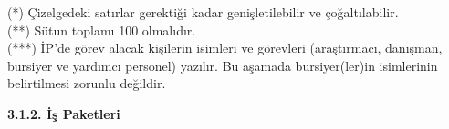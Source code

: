 \begin{landscape}
\begin{center}
\end{center}





{\footnotesize
\noindent(*) Çizelgedeki satırlar gerektiği kadar genişletilebilir ve çoğaltılabilir.\\
\noindent(**) Sütun toplamı 100 olmalıdır.\\
\noindent(***) İP'de görev alacak kişilerin isimleri ve görevleri (araştırmacı, danışman, bursiyer ve yardımcı personel) yazılır. Bu aşamada bursiyer(ler)in isimlerinin belirtilmesi zorunlu değildir.
}

\end{landscape}

\noindent\textbf{3.1.2. İş Paketleri}



